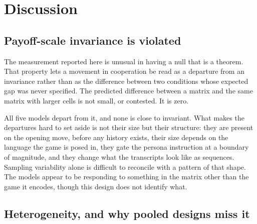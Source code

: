 \documentclass[11pt,a4paper]{article}
\begin{document}
%
%

\section{Discussion}
\label{sec:discussion}

\subsection{Payoff-scale invariance is violated}

The measurement reported here is unusual in having a null that is a theorem.
That property lets a movement in cooperation be read as a departure from an
invariance rather than as the difference between two conditions whose expected
gap was never specified. The predicted difference between a matrix and the same
matrix with larger cells is not small, or contested. It is zero.

All five models depart from it, and none is close to invariant. What makes the
departures hard to set aside is not their size but their structure: they are
present on the opening move, before any history exists, their size depends on
the language the game is posed in, they gate the persona instruction at a
boundary of magnitude, and they change what the transcripts look like as
sequences. Sampling variability alone is difficult to reconcile with a pattern
of that shape. The models appear to be responding to something in the matrix
other than the game it encodes, though this design does not identify what.

\subsection{Heterogeneity, and why pooled designs miss it}
\end{document}
